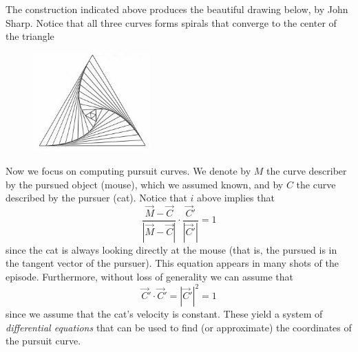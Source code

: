 The construction indicated above produces the beautiful drawing below, by John Sharp. Notice that all three curves forms spirals that converge to the center of the triangle
	\begin{figure}[H]
	   \centering
	   \includegraphics[width=0.4\textwidth]{season3/301/images/triangle2.jpg} 
	\end{figure}


 \vspace{0.2cm}


Now we focus on computing pursuit curves. We denote by $M$ the curve describer by the pursued object (mouse), which we assumed known, and by $C$ the curve described by the pursuer (cat). Notice that $i$ above implies that
	\[
	\dfrac{\vec{M} - \vec{C}}{\left| \vec{M} - \vec{C}\right|} \cdot \dfrac{\vec{C}'}{\left|\vec{C}'\right|} = 1
	\]
since the cat is always looking directly at the mouse (that is, the pursued is in the tangent vector of the pursuer). This equation appears in many shots of the episode. Furthermore, without loss of generality we can assume that  
	\[
	\vec{C}' \cdot \vec{C}' = \left|\vec{C}'\right|^2=1
	\]
since we assume that the cat's velocity is constant. These yield a system of \emph{differential equations} that can be used to find (or approximate) the coordinates of the pursuit curve. \\

